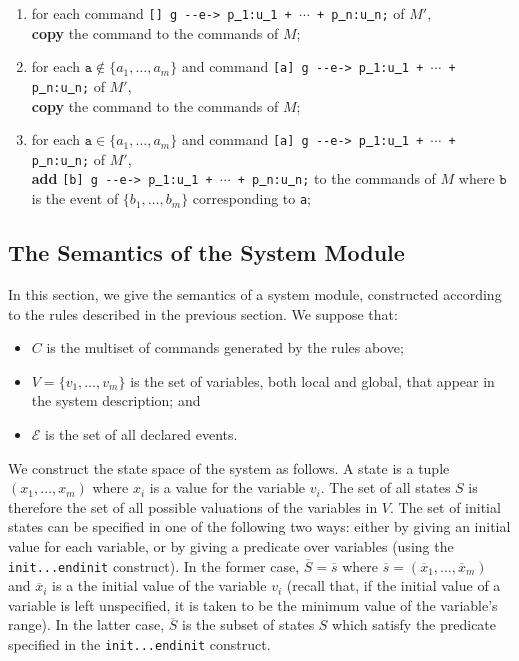 \documentclass{article}
\newcommand{\arci}[1]{{-}{-}{#1}->}
\newcommand{\calE}{\mathcal{E}}
\renewcommand{\_}{\underline{~}}
\newcommand{\events}{{\calE}}
\newcommand{\code}[1]{\texttt{#1}}
\begin{document}
\begin{enumerate}
	
    \item for each command \code{[] g \arci{e} p\_1:u\_1 + $\cdots$ + p\_n:u\_n;} of $M'$, \\ 
    \textbf{copy} the command to the commands of $M$;

    \item for each $\code{a} \not\in \{a_1,\ldots,a_m\}$ and command \code{[a] g \arci{e}  p\_1:u\_1 + $\cdots$ + p\_n:u\_n;} of $M'$, \\ 
    \textbf{copy} the command to the commands of $M$;

    \item for each $\code{a} \in \{a_1,\ldots,a_m\}$ and command \code{[a] g \arci{e}  p\_1:u\_1 + $\cdots$ + p\_n:u\_n;} of $M'$, \\
    \textbf{add} \code{[b] g \arci{e}  p\_1:u\_1 + $\cdots$ + p\_n:u\_n;} to the commands of $M$ where $\code{b}$ is the event of $\{b_1,\ldots,b_m\}$ corresponding to \code{a};

\end{enumerate}%

\subsection*{The Semantics of the System Module}
In this section, we give the semantics of a system module, constructed according to the rules described in the previous section.
We suppose that:
\begin{itemize}
	\item $C$ is the multiset of commands generated by the rules above;
	\item $V = \{v_1, \ldots , v_m\}$ is the set of variables, both local and global, that appear in the system description; and
	\item $\events$ is the set of all declared events.
\end{itemize}

We construct the state space of the system as follows. 
A state is a tuple $(x_1, \ldots , x_m)$ where $x_i$ is a value for the variable $v_i$. 
The set of all states $S$ is therefore the set of all possible valuations of the variables in $V$. 
The set of initial states can be specified in one of the following two ways: either by giving an initial value for each variable, or by giving a predicate over variables (using the \code{init...endinit} construct). 
In the former case, $\overline{S} = \overline{s}$ where $\overline{s} = (\overline{x}_1, \ldots , \overline{x}_m)$ and $\overline{x}_i$ is a the initial value of the variable $v_i$ (recall that, if the initial value of a variable is left unspecified, it is taken to be the minimum value of the variable’s range). 
In the latter case, $\overline{S}$ is the subset of states $S$ which satisfy the
predicate specified in the \code{init...endinit} construct.
\end{document}
